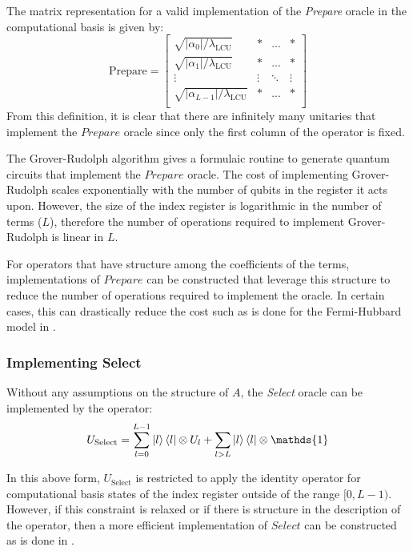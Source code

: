 The matrix representation for a valid implementation of the \textit{Prepare} oracle in the computational basis is given by:
\begin{equation}
    \text{Prepare} = \begin{bmatrix}
        \sqrt{|\alpha_0| / \lambda_\text{LCU}} & * & ... & * \\
        \sqrt{|\alpha_1| / \lambda_\text{LCU}} & * & ... & * \\
        \vdots & \vdots & \ddots & \vdots \\
        \sqrt{|\alpha_{L-1} |/ \lambda_\text{LCU}} & * & ... & * \\
    \end{bmatrix}
\end{equation}
From this definition, it is clear that there are infinitely many unitaries that implement the $\textit{Prepare}$ oracle since only the first column of the operator is fixed.

The Grover-Rudolph algorithm \cite{grover2002creating} gives a formulaic routine to generate quantum circuits that implement the $\textit{Prepare}$ oracle.
The cost of implementing Grover-Rudolph scales exponentially with the number of qubits in the register it acts upon.
However, the size of the index register is logarithmic in the number of terms ($L$), therefore the number of operations required to implement Grover-Rudolph is linear in $L$.

For operators that have structure among the coefficients of the terms, implementations of $\textit{Prepare}$ can be constructed that leverage this structure to reduce the number of operations required to implement the oracle.
In certain cases, this can drastically reduce the cost such as is done for the Fermi-Hubbard model in \cite{babbush2018encoding}.

\subsubsection{Implementing \textbf{Select}}

Without any assumptions on the structure of $A$, the \textit{Select} oracle can be implemented by the operator:
\begin{equation}
    \label{eq:select-naive}
    U_\text{Select} = \sum_{l=0}^{L-1} \ket{l}\bra{l} \otimes U_l + \sum_{l>L} \ket{l}\bra{l} \otimes \mathds{1}
\end{equation}

In this above form, $U_\text{Select}$ is restricted to apply the identity operator for computational basis states of the index register outside of the range $[0, L-1)$.
However, if this constraint is relaxed or if there is structure in the description of the operator, then a more efficient implementation of $\textit{Select}$ can be constructed as is done in \cite{babbush2018encoding}.  

